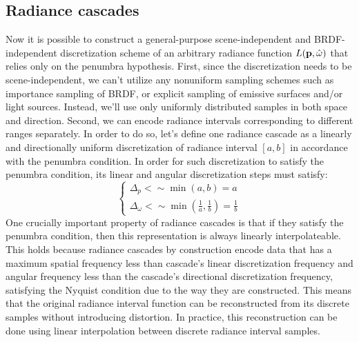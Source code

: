 \documentclass{jcgt}
\begin{document}

\subsection{Radiance cascades}
\label{sec:radiance_cascades}
Now it is possible to construct a general-purpose scene-independent and BRDF-independent discretization scheme of an arbitrary radiance function $L(\textbf p, \hat \omega)$ that relies only on the penumbra hypothesis.
First, since the discretization needs to be scene-independent, we can't utilize any nonuniform sampling schemes such as importance sampling of BRDF, or explicit sampling of emissive surfaces and/or light sources.
Instead, we'll use only uniformly distributed samples in both space and direction. Second, we can encode radiance intervals corresponding to different ranges separately. In order to do so, let's define one radiance cascade as a linearly and directionally uniform discretization of radiance interval $[a, b]$ in accordance with the penumbra condition.
In order for such discretization to satisfy the penumbra condition, its linear and angular discretization steps must satisfy:
\begin{equation}
  \begin{cases}
    \Delta_p<\sim\min(a, b)=a \\
    \Delta_\omega<\sim \min(\frac{1}{a}, \frac{1}{b})=\frac{1}{b}
    \label{eq:interval_ranges}
  \end{cases}
\end{equation}
\label{interpolateability}
One crucially important property of radiance cascades is that if they satisfy the penumbra condition, then this representation is always linearly interpolateable. This holds because radiance cascades by construction encode data that has a maximum spatial frequency less than cascade's linear discretization frequency and angular frequency less than the cascade's directional discretization frequency, satisfying the Nyquist condition due to the way they are constructed. This means that the original radiance interval function can be reconstructed from its discrete samples without introducing distortion. In practice, this reconstruction can be done using linear interpolation between discrete radiance interval samples.
\end{document}
